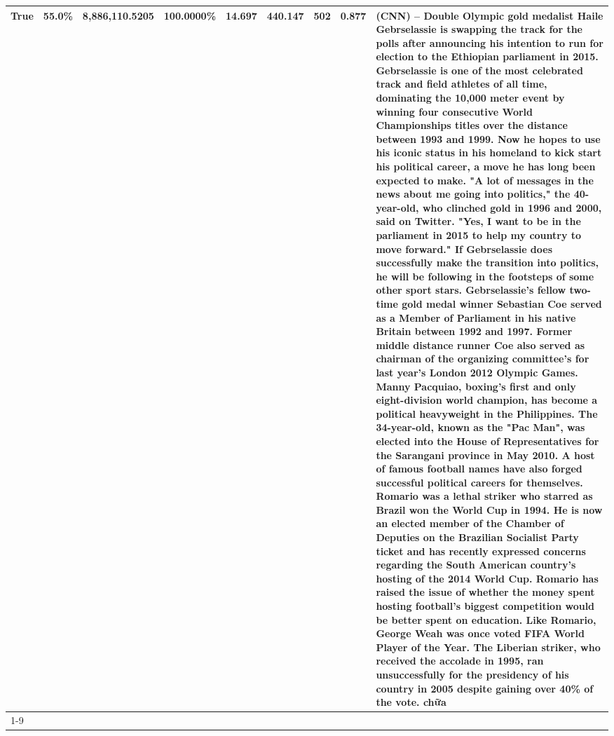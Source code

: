 \begin{table}[H]
{\begin{tabular}{lllrlllll}
True & 55.0\% & 8,886,110.5205 & \bfseries \color{red} 100.0000\% & 14.697 & 440.147 & 502 & 0.877 & (CNN) -- Double Olympic gold medalist Haile Gebrselassie is swapping the track for the polls after announcing his intention to run for election to the Ethiopian parliament in 2015. Gebrselassie is one of the most celebrated track and field athletes of all time, dominating the 10,000 meter event by winning four consecutive World Championships titles over the distance between 1993 and 1999. Now he hopes to use his iconic status in his homeland to kick start his political career, a move he has long been expected to make. "A lot of messages in the news about me going into politics," the 40-year-old, who clinched gold in 1996 and 2000, said on Twitter. "Yes, I want to be in the parliament in 2015 to help my country to move forward." If Gebrselassie does successfully make the transition into politics, he will be following in the footsteps of some other sport stars. Gebrselassie's fellow two-time gold medal winner Sebastian Coe served as a Member of Parliament in his native Britain between 1992 and 1997. Former middle distance runner Coe also served as chairman of the organizing committee's for last year's London 2012 Olympic Games. Manny Pacquiao, boxing's first and only eight-division world champion, has become a political heavyweight in the Philippines. The 34-year-old, known as the "Pac Man", was elected into the House of Representatives for the Sarangani province in May 2010. A host of famous football names have also forged successful political careers for themselves. Romario was a lethal striker who starred as Brazil won the World Cup in 1994. He is now an elected member of the Chamber of Deputies on the Brazilian Socialist Party ticket and has recently expressed concerns regarding the South American country's hosting of the 2014 World Cup. Romario has raised the issue of whether the money spent hosting football's biggest competition would be better spent on education. Like Romario, George Weah was once voted FIFA World Player of the Year. The Liberian striker, who received the accolade in 1995, ran unsuccessfully for the presidency of his country in 2005 despite gaining over 40\% of the vote. chữa \\
\cline{1-9}

\end{tabular}}
\end{table}

